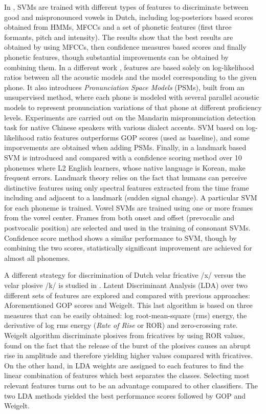 In \cite{detection_mispronunciation_dutch_vowel}, SVMs are trained with different types of
features to discriminate between good and mispronounced vowels in Dutch, including log-posteriors
based scores obtained from HMMs, MFCCs and a set of 
phonetic features (first three formants, pitch and intensity). The results show that the best 
results are obtained by using MFCCs, then confidence measures based scores and finally phonetic
features, though substantial improvements can be obtained by combining them.
In a different work \cite{svm_space_models}, features are based solely on
log-likelihood ratios between all the acoustic models and the model corresponding to the given
phone. It also introduces \textit{Pronunciation Space Models} (PSMs), 
built from an unsupervised method, where
each phone is modeled with several parallel acoustic models to represent pronunciation 
variations of that phone at different proficiency levels. Experiments are carried out on the 
Mandarin mispronunciation detection task for native Chinese speakers with various dialect accents.
SVM based on log-likelihood ratio features outperforms GOP scores (used as baseline), and some
imporvements are obtained when adding PSMs.
Finally, in \cite{landmark_svm}\cite{landmark_svm_2} a landmark based 
SVM is introduced and compared with a confidence scoring method over 10 phonemes where 
L2 English learners, whose native language is Korean, make frequent errors. 
Landmark theory relies on the fact that humans can perceive distinctive
features using only spectral features extracted from the time frame including and adjacent to
a landmark (sudden signal change). A particular SVM for each phoneme is trained. Vowel SVMs are 
trained using one or more frames from the vowel center. Frames from both onset and offset
(prevocalic and postvocalic position) are selected and used in the training of consonant
SVMs. Confidence score method shows a similar performance to SVM, though by combining 
the two scores, statistically significant improvement are achieved for almost all phonemes.

A different strategy for discrimination of Dutch velar fricative /x/ versus the velar plosive
/k/ is studied in \cite{lda_weigelt}. Latent Discriminant Analysis (LDA) over two different sets
of features are explored and compared with previous approaches: Aforementioned GOP scores and
Weigelt. This last algorithm is based on three measures that can be easily obtained:
log root-mean-square (rms) energy, the derivative of log rms energy (\textit{Rate of Rise} or
ROR) and zero-crossing rate. Weigelt algorithm discriminate plosives from fricatives by using
ROR values, found on the fact that the release of the burst of the plosives causes an abrupt
rise in amplitude and therefore yielding higher values compared with fricatives.
On the other hand, in LDA weights are assigned to each features to 
find the linear combination of features
which best separates the classes. Selecting most relevant features turns out to be an
advantage compared to other classifiers. The two LDA methods yielded the best performance
scores followed by GOP and Weigelt.


